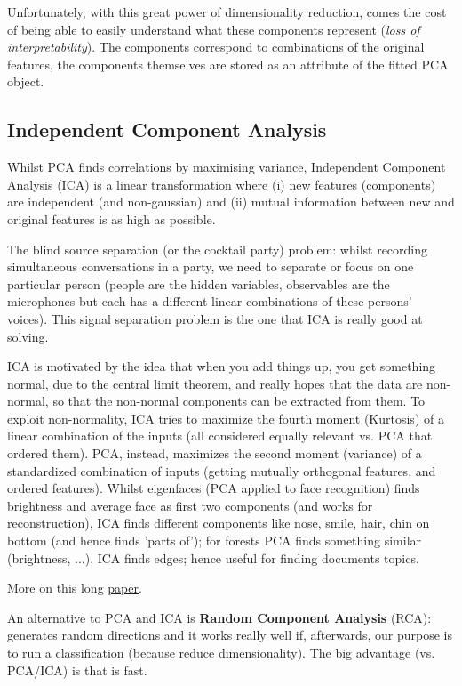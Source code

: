 \documentclass[11pt]{article}
\begin{document}
Unfortunately, with this great power of dimensionality reduction, comes the cost of being able to easily understand what these components represent (\textit{loss of interpretability}). The components correspond to combinations of the original features, the components themselves are stored as an attribute of the fitted PCA object.

\subsection{Independent Component Analysis}
Whilst PCA finds correlations by maximising variance, Independent Component Analysis (ICA) is a linear transformation where (i) new features (components) are independent (and non-gaussian) and (ii) mutual information between new and original features is as high as possible. 

The blind source separation (or the cocktail party) problem: whilst recording simultaneous conversations in a party, we need to separate or focus on one particular person (people are the hidden variables, observables are the microphones but each has a different linear combinations of these persons' voices). This signal separation problem is the one that ICA is really good at solving. 

ICA is motivated by the idea that when you add things up, you get something normal, due to the central limit theorem, and really hopes that the data are non-normal, so that the non-normal components can be extracted from them. To exploit non-normality, ICA tries to maximize the fourth moment (Kurtosis) of a linear combination of the inputs (all considered equally relevant vs. PCA that ordered them). PCA, instead, maximizes the second moment (variance) of a standardized combination of inputs (getting mutually orthogonal features, and ordered features). Whilst eigenfaces (PCA applied to face recognition) finds brightness and average face as first two components (and works for reconstruction), ICA finds different components like nose, smile, hair, chin on bottom (and hence finds 'parts of'); for forests PCA finds something similar (brightness, ...), ICA finds edges; hence useful for finding documents topics.

More on this long \href{https://www.cs.helsinki.fi/u/ahyvarin/papers/NN00new.pdf}{paper}.

An alternative to PCA and ICA is \textbf{Random Component Analysis} (RCA): generates random directions and it works really well if, afterwards, our purpose is to run a classification (because reduce dimensionality). The big advantage (vs. PCA/ICA) is that is fast.
\end{document}
